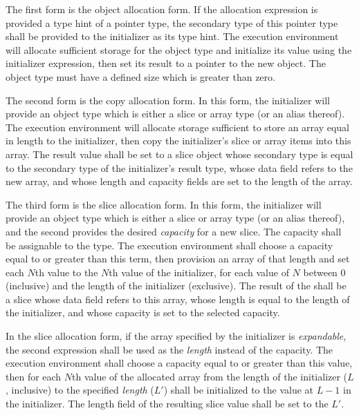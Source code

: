 \specsubsubitem
The first form is the object allocation form. If the allocation expression is
provided a type hint of a pointer type, the secondary type of this pointer type
shall be provided to the initializer as its type hint. The execution
environment will allocate sufficient storage for the object type and initialize
its value using the initializer expression, then set its result to a pointer to
the new object. The object type must have a defined size which is greater than
zero.

\specsubsubitem
The second form is the copy allocation form. In this form, the initializer will
provide an object type which is either a slice or array type (or an alias
thereof). The execution environment will allocate storage sufficient to store
an array equal in length to the initializer, then copy the initializer's slice
or array items into this array. The result value shall be set to a slice object
whose secondary type is equal to the secondary type of the initializer's result
type, whose data field refers to the new array, and whose length and capacity
fields are set to the length of the array.

\specsubsubitem
The third form is the slice allocation form. In this form, the initializer will
provide an object type which is either a slice or array type (or an alias
thereof), and the second  provides the desired
\textit{capacity} for a new slice. The capacity shall be assignable to the
 type. The execution environment shall choose a capacity equal to
or greater than this term, then provision an array of that length and set each
$N$th value to the $N$th value of the initializer, for each value of $N$ between
$0$ (inclusive) and the length of the initializer (exclusive). The result of the
 shall be a slice whose data field refers to
this array, whose length is equal to the length of the initializer, and whose
capacity is set to the selected capacity.

\specsubsubitem
In the slice allocation form, if the array specified by the initializer is
\textit{expandable}, the second expression shall be used as the \textit{length}
instead of the capacity. The execution environment shall choose a capacity
equal to or greater than this value, then for each $N$th value of the allocated
array from the length of the initializer ($L$, inclusive) to the specified
\textit{length} ($L'$) shall be initialized to the value at $L-1$ in the
initializer. The length field of the resulting slice value shall be set to the
$L'$.

